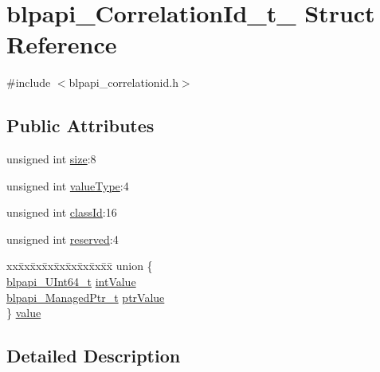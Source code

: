 \hypertarget{structblpapi___correlation_id__t__}{}\section{blpapi\+\_\+\+Correlation\+Id\+\_\+t\+\_\+ Struct Reference}
\label{structblpapi___correlation_id__t__}


{\ttfamily \#include $<$blpapi\+\_\+correlationid.\+h$>$}

\subsection*{Public Attributes}
\begin{DoxyCompactItemize}
\item 
unsigned int \hyperlink{structblpapi___correlation_id__t___abef27e4a792faf00f4306d93788d0051}{size}\+:8
\item 
unsigned int \hyperlink{structblpapi___correlation_id__t___ab7bce6fc7b549d65d62ba08d66a800bc}{value\+Type}\+:4
\item 
unsigned int \hyperlink{structblpapi___correlation_id__t___abd17f7805ce2ed86072862ab07c6225e}{class\+Id}\+:16
\item 
unsigned int \hyperlink{structblpapi___correlation_id__t___a45f729e0cacecfdf391abf228a261e2a}{reserved}\+:4
\item 
\begin{tabbing}
xx\=xx\=xx\=xx\=xx\=xx\=xx\=xx\=xx\=\kill
union \{\\
\>\hyperlink{blpapi__types_8h_a224c1e419031c7f875bbbc77fd73a3ab}{blpapi\_UInt64\_t} \hyperlink{structblpapi___correlation_id__t___a7fd476d7c55a9be437ce6b57d9125705}{intValue}\\
\>\hyperlink{blpapi__correlationid_8h_aebaf4a6d88e59a288902e24314981168}{blpapi\_ManagedPtr\_t} \hyperlink{structblpapi___correlation_id__t___a0f7141d09f25f178eaebff1e2986e64c}{ptrValue}\\
\} \hyperlink{structblpapi___correlation_id__t___aede39fa56134d13faf86f52b10798e98}{value}\\

\end{tabbing}\end{DoxyCompactItemize}


\subsection{Detailed Description}


